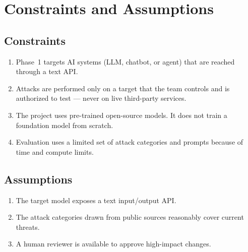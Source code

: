 \section{Constraints and Assumptions}

\subsection{Constraints}
\begin{enumerate}
  \item Phase~1 targets AI systems (LLM, chatbot, or agent) that are reached
  through a text API.
  \item Attacks are performed only on a target that the team controls and is
  authorized to test --- never on live third-party services.
  \item The project uses pre-trained open-source models. It does not train a
  foundation model from scratch.
  \item Evaluation uses a limited set of attack categories and prompts because of
  time and compute limits.
\end{enumerate}

\subsection{Assumptions}
\begin{enumerate}
  \item The target model exposes a text input/output API.
  \item The attack categories drawn from public sources reasonably cover current
  threats.
  \item A human reviewer is available to approve high-impact changes.
\end{enumerate}
